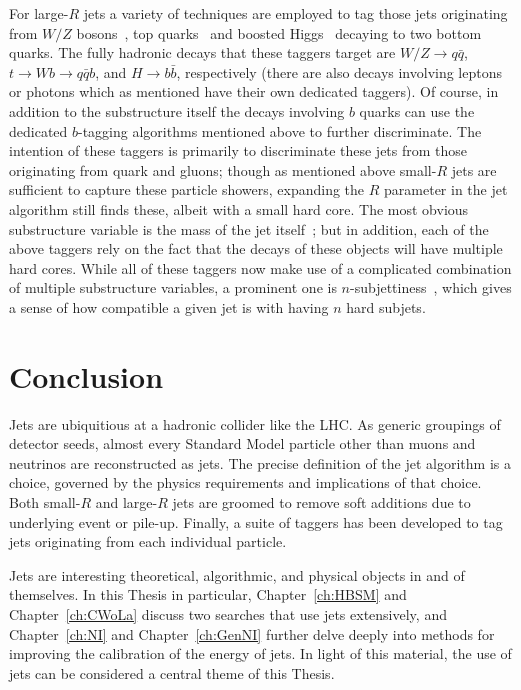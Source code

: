For large-$R$ jets a variety of techniques are employed to tag those jets originating from $W/Z$ bosons~\cite{ATL-PHYS-PUB-2014-004,Aad:2015rpa,Aaboud:2018psm}, top quarks~\cite{Aad:2016pux,Aaboud:2018psm} and boosted Higgs~\cite{Aad:2019uoz} decaying to two bottom quarks.
The fully hadronic decays that these taggers target are $W/Z\rightarrow q\bar{q}$, $t\rightarrow Wb \rightarrow q\bar{q} b$, and $H\rightarrow b\bar{b}$, respectively (there are also decays involving leptons or photons which as mentioned have their own dedicated taggers).
Of course, in addition to the substructure itself the decays involving $b$ quarks can use the dedicated $b$-tagging algorithms mentioned above to further discriminate.
The intention of these taggers is primarily to discriminate these jets from those originating from quark and gluons; though as mentioned above small-$R$ jets are sufficient to capture these particle showers, expanding the $R$ parameter in the jet algorithm still finds these, albeit with a small hard core.
The most obvious substructure variable is the mass of the jet itself~\cite{ATLAS-CONF-2016-035}; but in addition, each of the above taggers rely on the fact that the decays of these objects will have multiple hard cores.
While all of these taggers now make use of a complicated combination of multiple substructure variables, a prominent one is $n$-subjettiness~\cite{Thaler:2010tr}, which gives a sense of how compatible a given jet is with having $n$ hard subjets.

\section{Conclusion}
\label{sec:jets:conclusion}
Jets are ubiquitious at a hadronic collider like the LHC.
As generic groupings of detector seeds, almost every Standard Model particle other than muons and neutrinos are reconstructed as jets.
The precise definition of the jet algorithm is a choice, governed by the physics requirements and implications of that choice.
Both small-$R$ and large-$R$ jets are groomed to remove soft additions due to underlying event or pile-up.
Finally, a suite of taggers has been developed to tag jets originating from each individual particle.

Jets are interesting theoretical, algorithmic, and physical objects in and of themselves.
In this Thesis in particular, Chapter~\ref{ch:HBSM} and Chapter~\ref{ch:CWoLa} discuss two searches that use jets extensively, and Chapter~\ref{ch:NI} and Chapter~\ref{ch:GenNI} further delve deeply into methods for improving the calibration of the energy of jets.
In light of this material, the use of jets can be considered a central theme of this Thesis.
